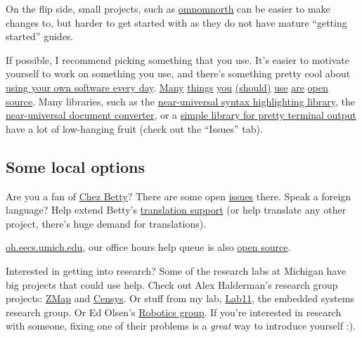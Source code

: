 \documentclass{article}
\begin{document}
On the flip side, small projects, such as
\href{https://github.com/kylelady/omnomnorth}{omnomnorth}
can be easier to make changes to, but harder to get started with as they do
not have mature ``getting started'' guides.

If possible, I recommend picking something that you use. It's easier to
motivate yourself to work on something you use, and there's something pretty
cool about \href{https://github.com/um-cseg/chez-betty/}{using your own
software every day}.
\href{https://github.com/Aluxian/Facebook-Messenger-Desktop}{Many}
\href{https://github.com/GNOME/gnome-terminal}{things}
\href{https://github.com/gnachman/iTerm2}{you}
\href{https://github.com/tmux/tmux}{(should)}
\href{https://trac.transmissionbt.com/wiki/Building}{use}
\href{https://github.com/scummvm/scummvm}{are}
\href{https://github.com/GNOME/gimp}{open}
\href{https://github.com/videolan/vlc}{source}.
Many libraries, such as the
\href{https://bitbucket.org/birkenfeld/pygments-main}
{near-universal syntax highlighting library}, the
\href{https://github.com/jgm/pandoc}
{near-universal document converter}, or a
\href{https://github.com/tartley/colorama}
{simple library for pretty terminal output}
have a lot of low-hanging fruit (check out the ``Issues'' tab).

\subsection*{Some local options}

Are you a fan of \href{https://chezbetty.eecs.umich.edu}{Chez Betty}? There
are some open \href{https://github.com/um-cseg/chez-betty/issues}{issues} there.
Speak a foreign language? Help extend Betty's
\href{https://github.com/um-cseg/chez-betty/blob/master/README.translation.md}{translation
support} (or help translate any other project, there's huge demand for
translations).

\href{https://oh.eecs.umich.edu}{oh.eecs.umich.edu}, our office hours help queue is also
\href{https://github.com/mterwill/office-hours-help-queue/issues}{open source}.

Interested in getting into research? Some of the research labs at Michigan
have big projects that could use help. Check out Alex Halderman's research group
projects: \href{https://github.com/zmap}{ZMap} and
\href{https://github.com/Censys}{Censys}. Or stuff from my lab,
\href{https://github.com/lab11}{Lab11}, the embedded systems research group.
Or Ed Olsen's \href{https://april.eecs.umich.edu/software/}{Robotics group}.
If you're interested in research with someone, fixing one of their problems is
a \emph{great} way to introduce yourself :).
\end{document}
